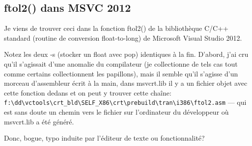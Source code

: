 
\subsection{ftol2() dans MSVC 2012}

Je viens de trouver ceci dans la fonction ftol2() de la bibliothèque C/C++ standard
(routine de conversion float-to-long) de Microsoft Visual Studio 2012.



Notez les deux -s (stocker un float avec pop) identiques à la fin.
D'abord, j'ai cru qu'il s'agissait d'une anomalie du compilateur (je collectionne
de tels cas tout comme certains collectionnent les papillons), mais il semble qu'il
s'agisse d'un morceau d'assembleur écrit à la main, dans msvcrt.lib il y a un fichier
objet avec cette fonction dedans et on peut y trouver cette chaîne:\\
\verb|f:\dd\vctools\crt_bld\SELF_X86\crt\prebuild\tran\i386\ftol2.asm| ---
qui est sans doute un chemin vers le fichier sur l'ordinateur du développeur où
msvcrt.lib a été généré.

Donc, bogue, typo induite par l'éditeur de texte ou fonctionnalité?

